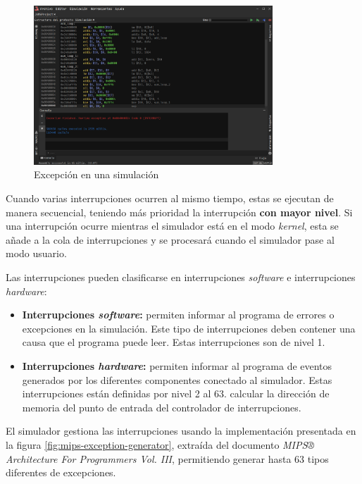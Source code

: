 \begin{figure}[h]
    \centering
    \includegraphics[width=0.8\textwidth]{images/mips/jams-exception}
    \caption{Excepción en una simulación}
    \label{fig:jams-exception}
\end{figure}

Cuando varias interrupciones ocurren al mismo tiempo,
estas se ejecutan de manera secuencial, teniendo más prioridad
la interrupción \textbf{con mayor nivel}.
Si una interrupción ocurre mientras el simulador está en el
modo \textit{kernel}, esta se añade a la cola de interrupciones
y se procesará cuando el simulador pase al modo usuario.

Las interrupciones pueden clasificarse en interrupciones
\textit{software} e interrupciones \textit{hardware}:
\begin{itemize}
    \item \textbf{Interrupciones \textit{software}:} permiten informar
    al programa de errores o excepciones en la simulación.
    Este tipo de interrupciones deben contener una causa que
    el programa puede leer.
    Estas interrupciones son de nivel 1.
    \item \textbf{Interrupciones \textit{hardware}:} permiten informar
    al programa de eventos generados por los diferentes componentes
    conectado al simulador.
    Estas interrupciones están definidas por 
    nivel 2 al 63.
     calcular la dirección de memoria
    del punto de entrada del controlador de interrupciones.
\end{itemize}

El simulador gestiona las interrupciones usando la
implementación presentada en la figura \ref{fig:mips-exception-generator},
extraída del documento
\textit{MIPS® Architecture For Programmers Vol. III}\cite{MIPS_VOL_3},
permitiendo generar hasta 63 tipos diferentes de excepciones.

